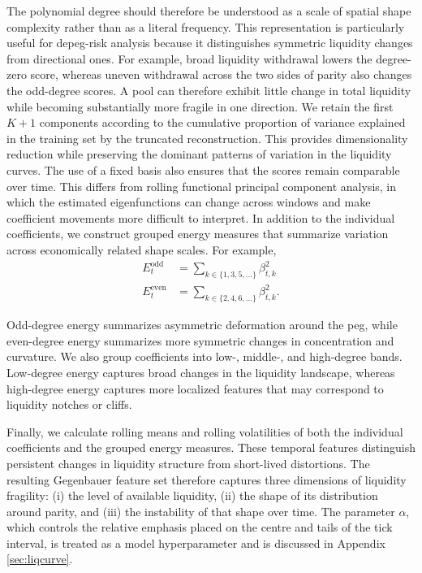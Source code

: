 \documentclass[a4paper,fleqn]{cas-sc}
\begin{document}
The polynomial degree should therefore be understood as a scale of spatial shape complexity rather than as a literal frequency.
This representation is particularly useful for depeg-risk analysis because it distinguishes symmetric liquidity changes from directional ones. For example, broad liquidity withdrawal lowers the degree-zero score,
whereas uneven withdrawal across the two sides of parity also changes
the odd-degree scores. A pool can therefore exhibit little change in total liquidity while becoming substantially more fragile in one direction.
We retain the first \(K+1\) components according to the cumulative proportion of variance explained in the training set by the truncated reconstruction. This provides dimensionality reduction while preserving the dominant patterns of variation in the liquidity curves. The use of a fixed basis also ensures that the scores remain comparable over time. This differs from rolling functional principal component analysis, in which the estimated eigenfunctions can change across windows and make coefficient movements more difficult to interpret.
In addition to the individual coefficients, we construct grouped energy measures that summarize variation across economically related shape scales. For example,
\begin{equation}
\begin{split}
E_t^{\mathrm{odd}}&=\sum_{k\in\{1,3,5,\ldots\}}\beta_{t,k}^{2} \\
E_t^{\mathrm{even}}&=\sum_{k\in\{2,4,6,\ldots\}}\beta_{t,k}^{2}.
\end{split}
\end{equation}

Odd-degree energy summarizes asymmetric deformation around the peg, while even-degree energy summarizes more symmetric changes in concentration and curvature. We also group coefficients into low-, middle-, and high-degree bands. Low-degree energy captures broad changes in the liquidity landscape, whereas high-degree energy captures more localized features that may correspond to liquidity notches or cliffs.

Finally, we calculate rolling means and rolling volatilities of both the individual coefficients and the grouped energy measures. These temporal features distinguish persistent changes in liquidity structure from short-lived distortions. The resulting Gegenbauer feature set therefore captures three dimensions of liquidity fragility: (i) the level of available liquidity, (ii) the shape of its distribution around parity, and (iii) the instability of that shape over time. The parameter \(\alpha\), which controls the relative emphasis placed on the centre and tails of the tick interval, is treated as a model hyperparameter and is discussed in Appendix \ref{sec:liqcurve}.
\end{document}
